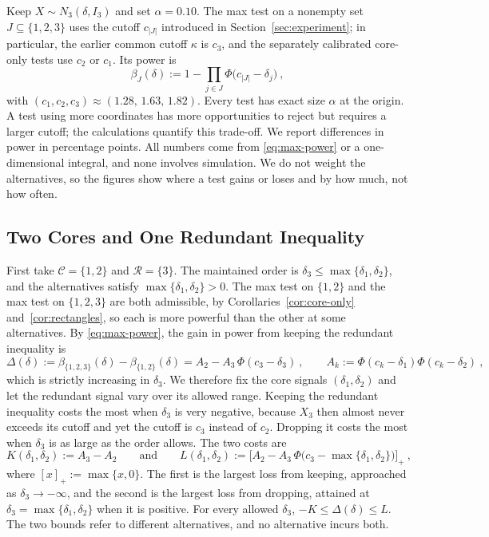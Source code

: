 \documentclass[11pt]{article}
\numberwithin{equation}{section}
\theoremstyle{definition}
\begin{document}
Keep $X\sim N_3(\delta,I_3)$ and set $\alpha=0.10$. The max test on a nonempty set $J\subseteq\{1,2,3\}$ uses the cutoff $c_{|J|}$ introduced in Section~\ref{sec:experiment}; in particular, the earlier common cutoff $\kappa$ is $c_3$, and the separately calibrated core-only tests use $c_2$ or $c_1$. Its power is
\begin{equation}\label{eq:max-power}
\beta_J(\delta):=1-\prod_{j\in J}\Phi\big(c_{|J|}-\delta_j\big)~,
\end{equation}
with $(c_1,c_2,c_3)\approx(1.28,\,1.63,\,1.82)$. Every test has exact size $\alpha$ at the origin. A test using more coordinates has more opportunities to reject but requires a larger cutoff; the calculations quantify this trade-off. We report differences in power in percentage points. All numbers come from \eqref{eq:max-power} or a one-dimensional integral, and none involves simulation. We do not weight the alternatives, so the figures show where a test gains or loses and by how much, not how often.

\subsection{Two Cores and One Redundant Inequality}\label{sec:power-two-cores}

First take $\mathcal C=\{1,2\}$ and $\mathcal R=\{3\}$. The maintained order is $\delta_3\le\max\{\delta_1,\delta_2\}$, and the alternatives satisfy $\max\{\delta_1,\delta_2\}>0$. The max test on $\{1,2\}$ and the max test on $\{1,2,3\}$ are both admissible, by Corollaries~\ref{cor:core-only} and~\ref{cor:rectangles}, so each is more powerful than the other at some alternatives. By \eqref{eq:max-power}, the gain in power from keeping the redundant inequality is
\begin{equation}\label{eq:keep-minus-drop}
\Delta(\delta):=\beta_{\{1,2,3\}}(\delta)-\beta_{\{1,2\}}(\delta)=A_2-A_3\,\Phi(c_3-\delta_3)~,
\qquad
A_k:=\Phi(c_k-\delta_1)\Phi(c_k-\delta_2)~,
\end{equation}
which is strictly increasing in $\delta_3$. We therefore fix the core signals $(\delta_1,\delta_2)$ and let the redundant signal vary over its allowed range. Keeping the redundant inequality costs the most when $\delta_3$ is very negative, because $X_3$ then almost never exceeds its cutoff and yet the cutoff is $c_3$ instead of $c_2$. Dropping it costs the most when $\delta_3$ is as large as the order allows. The two costs are
\begin{equation}\label{eq:K-L}
K(\delta_1,\delta_2):=A_3-A_2
\qquad\text{and}\qquad
L(\delta_1,\delta_2):=\big[A_2-A_3\,\Phi\big(c_3-\max\{\delta_1,\delta_2\}\big)\big]_+~,
\end{equation}
where $[x]_+:=\max\{x,0\}$. The first is the largest loss from keeping, approached as $\delta_3\to-\infty$, and the second is the largest loss from dropping, attained at $\delta_3=\max\{\delta_1,\delta_2\}$ when it is positive. For every allowed $\delta_3$, $-K\le\Delta(\delta)\le L$. The two bounds refer to different alternatives, and no alternative incurs both.
\end{document}

